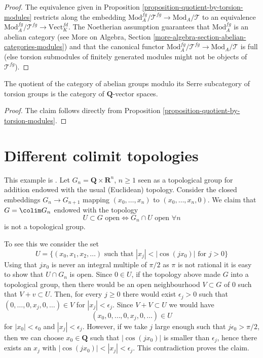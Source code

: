 \begin{proof}
The equivalence given in Proposition
\ref{proposition-quotient-by-torsion-modules} restricts along the embedding
$\text{Mod}_A^{fg}/\mathcal{T}^{fg} \to \text{Mod}_A/\mathcal{T}$ to an
equivalence $\text{Mod}_A^{fg}/\mathcal{T}^{fg} \to \text{Vect}_K^{fd}$.
The Noetherian assumption guarantees that $\text{Mod}_A^{fg}$ is an
abelian category (see
More on Algebra, Section \ref{more-algebra-section-abelian-categories-modules})
and that the canonical functor
$\text{Mod}_A^{fg}/\mathcal{T}^{fg} \to \text{Mod}_A/\mathcal{T}$
is full (else torsion submodules of finitely
generated modules might not be objects of $\mathcal{T}^{fg}$).
\end{proof}

\begin{proposition}
\label{proposition-quotient-abelian-groups-by-torsion-groups}
The quotient of the category of abelian groups modulo its
Serre subcategory of torsion groups is the category of
$\mathbf{Q}$-vector spaces.
\end{proposition}

\begin{proof}
The claim follows directly from
Proposition \ref{proposition-quotient-by-torsion-modules}.
\end{proof}




\section{Different colimit topologies}
\label{section-colimit-topology}

\noindent
This example is \cite[Example 1.2, page 553]{TSH}. Let
$G_n = \mathbf{Q} \times \mathbf{R}^n$, $n \geq 1$ seen as a topological group
for addition endowed with the usual (Euclidean) topology. Consider the closed
embeddings $G_n \to G_{n + 1}$ mapping $(x_0, \ldots, x_n)$ to
$(x_0, \ldots, x_n, 0)$. We claim that $G = \colim G_n$ endowed with the
topology
$$
U \subset G\text{ open} \Leftrightarrow G_n \cap U\text{ open }\forall n
$$
is not a topological group.

\medskip\noindent
To see this we consider the set
$$
U = \{(x_0, x_1, x_2, \ldots)\text{ such that }
|x_j| < |\cos(jx_0)| \text{ for } j > 0\}
$$
Using that $jx_0$ is never an integral multiple of $\pi/2$ as $\pi$
is not rational it is easy to show that $U \cap G_n$ is open. Since
$0 \in U$, if the topology above made $G$ into a topological group,
then there would be an open neighbourhood $V \subset G$ of $0$
such that $V + v \subset U$. Then, for every $j \geq 0$ there would
exist $\epsilon_j > 0$ such that $(0, \ldots, 0, x_j, 0, \ldots) \in V$
for $|x_j| < \epsilon_j$. Since $V + V \subset U$ we would have
$$
(x_0, 0, \ldots, 0, x_j, 0, \ldots) \in U
$$
for $|x_0| < \epsilon_0$ and $|x_j| < \epsilon_j$. However, if we
take $j$ large enough such that $j \epsilon_0 > \pi/2$, then we can
choose $x_0 \in \mathbf{Q}$ such that $|\cos(jx_0)|$ is smaller than
$\epsilon_j$, hence there exists an $x_j$ with
$|\cos(jx_0)| < |x_j| < \epsilon_j$. This contradiction proves the claim.

